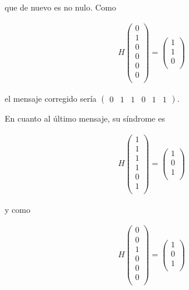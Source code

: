 \documentclass{article}
\begin{document}
que de nuevo es no nulo. Como 

\begin{align*}
  H
  \begin{pmatrix} 
    0 \\
    1 \\
    0 \\
    0 \\
    0 \\
    0 \\
  \end{pmatrix}
  = \begin{pmatrix} 
    1 \\ 
    1 \\
    0 \\
  \end{pmatrix}
\end{align*}

el mensaje corregido sería $\begin{pmatrix}
0 & 1 & 1 & 0 & 1 & 1 \end{pmatrix}$.

En cuanto al último mensaje, su síndrome es 

\begin{align*}
  H
  \begin{pmatrix} 
    1 \\
    1 \\
    1 \\
    1 \\
    0 \\
    1 \\
  \end{pmatrix}
  = \begin{pmatrix} 
    1 \\ 
    0 \\
    1 \\
  \end{pmatrix}
\end{align*}

y como

\begin{align*}
  H
  \begin{pmatrix} 
    0 \\
    0 \\
    1 \\
    0 \\
    0 \\
    0 \\
  \end{pmatrix}
  = \begin{pmatrix} 
    1 \\ 
    0 \\
    1 \\
  \end{pmatrix}
\end{align*}
\end{document}
